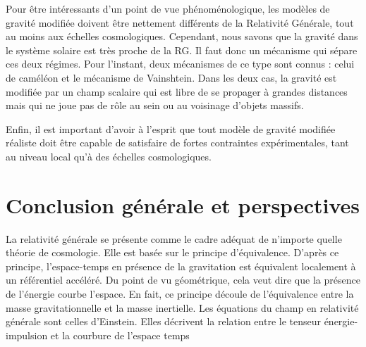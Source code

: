\documentclass[a4paper,12pt]{report}
\theoremstyle{plain}
\theoremstyle{plain}
\begin{document}
Pour \^etre int\'eressants d'un point de vue ph\'enom\'enologique, les mod\`eles de gravit\'e
modifi\'ee doivent \^etre nettement diff\'erents de la Relativit\'e G\'en\'erale, tout au moins aux
\'echelles cosmologiques. Cependant, nous savons que la gravit\'e dans le syst\`eme solaire est
tr\`es proche de la RG. Il faut donc un m\'ecanisme qui s\'epare ces deux r\'egimes. Pour l'instant,
deux m\'ecanismes de ce type sont connus : celui de cam\'el\'eon et le m\'ecanisme de Vainshtein.
Dans les deux cas, la gravit\'e est modifi\'ee par un champ scalaire qui est libre de se propager
\`a grandes distances mais qui ne joue pas de r\^ole au sein ou au voisinage d'objets massifs.

Enfin, il est important d'avoir \`a l'esprit que tout mod\`ele de gravit\'e modifi\'ee r\'ealiste
doit \^etre capable de satisfaire de fortes contraintes exp\'erimentales, tant au niveau local
qu'\`a des \'echelles cosmologiques. 

\chapter{Conclusion g\'en\'erale et perspectives} \label{chapitre 6}

La relativité générale se présente comme le cadre adéquat de n’importe
quelle théorie de cosmologie. Elle est basée sur le principe
d’équivalence. D’après ce principe, l’espace-temps en présence de la gravitation est équivalent localement à un référentiel accéléré. Du point de vu géométrique, cela veut dire que la présence de l’énergie courbe l’espace. En fait, ce principe découle de l’équivalence entre la masse gravitationnelle et la masse inertielle. Les équations du champ en relativité générale sont celles d’Einstein. Elles décrivent la relation entre le tenseur énergie-impulsion et la courbure de l’espace temps
\end{document}
